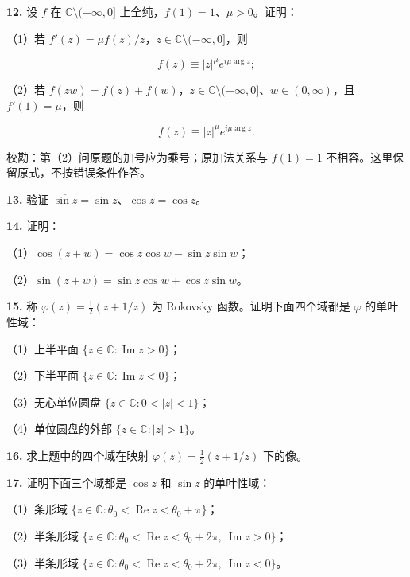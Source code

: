 \documentclass[11pt,a4paper]{article}
\begin{document}
\par{}
\noindent\textbf{12.} 设 \(f\) 在 \(\mathbb C\setminus(-\infty,0]\)
上全纯，\(f(1)=1\)、\(\mu>0\)。证明：

（1）若 \(f'(z)=\mu f(z)/z\)，\(z\in\mathbb C\setminus(-\infty,0]\)，则

\[
f(z)\equiv|z|^\mu e^{i\mu\arg z};
\]

（2）若
\(f(zw)=f(z)+f(w)\)，\(z\in\mathbb C\setminus(-\infty,0]\)、\(w\in(0,\infty)\)，且
\(f'(1)=\mu\)，则

\[
f(z)\equiv|z|^\mu e^{i\mu\arg z}.
\]

校勘：第（2）问原题的加号应为乘号；原加法关系与 \(f(1)=1\)
不相容。这里保留原式，不按错误条件作答。

\par{}
\noindent\textbf{13.} 验证
\(\overline{\sin z}=\sin\bar z\)、\(\overline{\cos z}=\cos\bar z\)。

\par{}
\noindent\textbf{14.} 证明：

（1）\(\cos(z+w)=\cos z\cos w-\sin z\sin w\)；

（2）\(\sin(z+w)=\sin z\cos w+\cos z\sin w\)。

\par{}
\noindent\textbf{15.} 称 \(\varphi(z)=\tfrac12(z+1/z)\) 为 Rokovsky
函数。证明下面四个域都是 \(\varphi\) 的单叶性域：

（1）上半平面 \(\{z\in\mathbb C:\operatorname{Im}z>0\}\)；

（2）下半平面 \(\{z\in\mathbb C:\operatorname{Im}z<0\}\)；

（3）无心单位圆盘 \(\{z\in\mathbb C:0<|z|<1\}\)；

（4）单位圆盘的外部 \(\{z\in\mathbb C:|z|>1\}\)。

\par{}
\noindent\textbf{16.} 求上题中的四个域在映射 \(\varphi(z)=\tfrac12(z+1/z)\)
下的像。

\par{}
\noindent\textbf{17.} 证明下面三个域都是 \(\cos z\) 和 \(\sin z\) 的单叶性域：

（1）条形域
\(\{z\in\mathbb C:\theta_0<\operatorname{Re}z<\theta_0+\pi\}\)；

（2）半条形域
\(\{z\in\mathbb C:\theta_0<\operatorname{Re}z<\theta_0+2\pi,\ \operatorname{Im}z>0\}\)；

（3）半条形域
\(\{z\in\mathbb C:\theta_0<\operatorname{Re}z<\theta_0+2\pi,\ \operatorname{Im}z<0\}\)。
\end{document}
